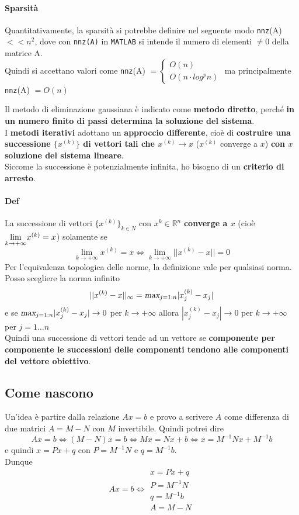 \documentclass[10pt]{book}
\begin{document}
\paragraph{Sparsità} Quantitativamente, la sparsità si potrebbe definire nel seguente modo \texttt{nnz}(A) $<< n^2$, dove con \texttt{nnz(A)} in \texttt{MATLAB} si intende il numero di elementi $\neq 0$ della matrice A.\\
Quindi si accettano valori come \texttt{nnz}(A) $= \left\{ \begin{array}{l}O(n) \\ O(n\cdot log^p n) \end{array} \right. $ ma principalmente \texttt{nnz}(A) $= O(n)$
\pagebreak

Il metodo di eliminazione gaussiana è indicato come \textbf{metodo diretto}, perché \textbf{in un numero finito di passi determina la soluzione del sistema}.\\
I \textbf{metodi iterativi} adottano un \textbf{approccio differente}, cioè di \textbf{costruire una successione $\{x^{(k)}\}$ di vettori tali che $x^{(k)} \rightarrow x$} ($x^{(k)}$ converge a $x$) \textbf{con $x$ soluzione del sistema lineare}.\\
Siccome la successione è potenzialmente infinita, ho bisogno di un \textbf{criterio di arresto}.
\paragraph{Def} La successione di vettori $\{x^{(k)}\}_{k\in N}$ con $x^{k} \in \mathbb{R}^n$ \textbf{converge a $x$} (cioè $\mathlarger{\lim_{k\to +\infty}} x^{(k)} = x$) solamente se
$$\lim_{k\to +\infty} x^{(k)} = x \Leftrightarrow \lim_{k\to +\infty} ||x^{(k)} - x|| = 0$$
Per l'equivalenza topologica delle norme, la definizione  vale per qualsiasi norma. Posso scegliere la norma infinito 
$$||x^{(k)} - x||_\infty = \textsl{max}_{j=1:n}|x_j^{(k)} - x_j|$$
e se $\textsl{max}_{j=1:n}|x_j^{(k)} - x_j| \rightarrow 0$ per $k \rightarrow +\infty$ allora $|x_j^{(k)} - x_j| \rightarrow 0$ per $k \rightarrow +\infty$ per $j = 1\ldots n$\\
Quindi una successione di vettori tende ad un vettore se \textbf{componente per componente le successioni delle componenti tendono alle componenti del vettore obiettivo}.
\subsection{Come nascono}
Un'idea è partire dalla relazione $Ax = b$ e provo a scrivere $A$ come differenza di due matrici $A = M - N$ con $M$ invertibile. Quindi potrei dire $$Ax = b \Leftrightarrow (M - N)x = b \Leftrightarrow Mx = Nx + b \Leftrightarrow x = M^{-1}Nx + M^{-1}b$$ e quindi $x = Px + q$ con $P = M^{-1}N$ e $q = M^{-1}b$.\\
Dunque $$Ax = b \Leftrightarrow \begin{array}{l}
x = Px + q \\
P = M^{-1}N\\q = M^{-1}b\\
A = M - N
\end{array}$$
\end{document}
